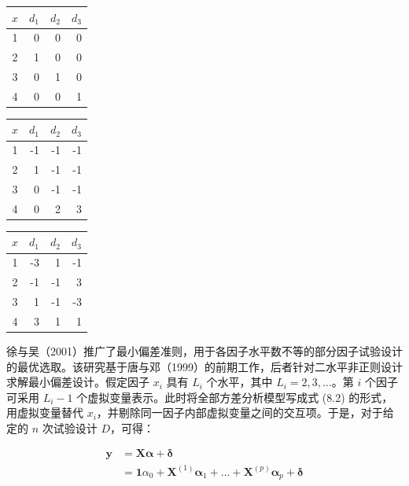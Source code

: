 \documentclass{ctexart}
\begin{document}
\begin{table}[htbp]
\begin{tabular}{c|r|r|r}
\hline
$x$ & $d_1$ & $d_2$ & $d_3$ \\
\hline
1 & 0 & 0 & 0 \\
2 & 1 & 0 & 0 \\
3 & 0 & 1 & 0 \\
4 & 0 & 0 & 1 \\
\hline
\end{tabular}
\end{table}

\begin{table}[htbp]
\begin{tabular}{c|r|r|r}
\hline
$x$ & $d_1$ & $d_2$ & $d_3$ \\
\hline
1 & -1 & -1 & -1 \\
2 & 1 & -1 & -1 \\
3 & 0 & -1 & -1 \\
4 & 0 & 2 & 3 \\
\hline
\end{tabular}
\end{table}

\begin{table}[htbp]
\begin{tabular}{c|r|r|r}
\hline
$x$ & $d_1$ & $d_2$ & $d_3$ \\
\hline
1 & -3 & 1 & -1 \\
2 & -1 & -1 & 3 \\
3 & 1 & -1 & -3 \\
4 & 3 & 1 & 1 \\
\hline
\end{tabular}
\end{table}

徐与吴（2001）推广了最小偏差准则，用于各因子水平数不等的部分因子试验设计的最优选取。该研究基于唐与邓（1999）的前期工作，后者针对二水平非正则设计求解最小偏差设计。假定因子 $x_i$ 具有 $L_i$ 个水平，其中 $L_i=2,3,\dots$。第 $i$ 个因子可采用 $L_i-1$ 个虚拟变量表示。此时将全部方差分析模型写成式 (8.2) 的形式，用虚拟变量替代 $x_i$，并剔除同一因子内部虚拟变量之间的交互项。于是，对于给定的 $n$ 次试验设计 $D$，可得：

\begin{align*}
\boldsymbol{y}&=\boldsymbol{X}\boldsymbol{\alpha}+\boldsymbol{\delta}\\
&=\boldsymbol{1}\alpha_0+\boldsymbol{X}^{(1)}\boldsymbol{\alpha}_1+\dots+\boldsymbol{X}^{(p)}\boldsymbol{\alpha}_p+\boldsymbol{\delta}
\end{align*}
\end{document}
